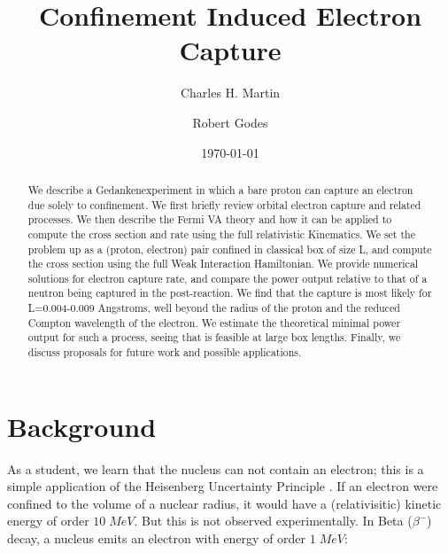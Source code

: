 \documentclass[%
 aip,
 jmp,%
 amsmath,amssymb,
 reprint,%
]{revtex4-1}
\begin{document}

\title[]{Confinement Induced Electron Capture}

\author{Charles H. Martin}
\author{Robert Godes}%
%


\date{\today}%

\begin{abstract}
We describe a Gedankenexperiment in which a bare proton can capture an electron due solely to confinement. We first briefly review orbital electron capture and related processes.  We then describe the Fermi VA theory and how it can be applied to compute the cross section and rate using the full relativistic Kinematics.  We set the problem up as a (proton, electron) pair confined in classical box of size L, and compute the cross section using the full Weak Interaction Hamiltonian.  We provide numerical solutions for electron capture rate, and compare the power output relative to that of a neutron being captured in the post-reaction.  We find that the capture is most likely for L=0.004-0.009 Angstroms, well beyond the radius of the proton and the reduced Compton wavelength of the electron.  We estimate the theoretical minimal power output for such a process, seeing that is feasible at large box lengths.  Finally, we discuss proposals for future work and possible applications.
\end{abstract}

\maketitle

\section{Background}

As a student, we learn that the nucleus can not contain an electron; this is a simple application of the Heisenberg Uncertainty Principle \cite{Weisskopf}.  If an electron were confined to the volume of a nuclear radius, it would have a (relativisitic) kinetic energy of order $10\;MeV$.  But this is not observed experimentally.  In Beta ($\beta^{-}$) decay, a nucleus emits an electron with energy of order $1\;MeV$: 
\end{document}
